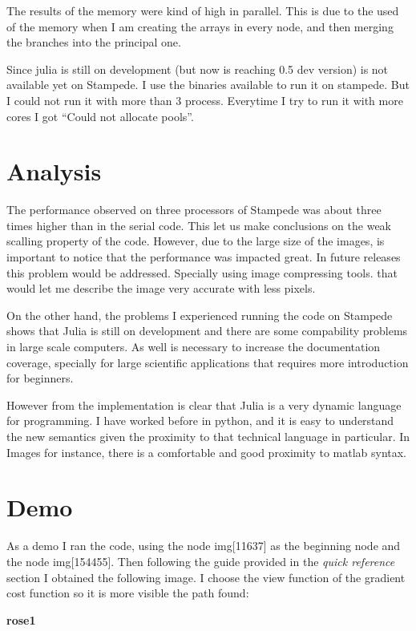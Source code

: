 \documentclass[letterpaper,10pt,english]{sphinxmanual}
\begin{document}
The results of the memory were kind of high in parallel. This is due to the used of the memory when I am creating the arrays in every node, and then merging the branches into the principal one.

Since julia is still on development (but now is reaching 0.5 dev version) is not available yet on Stampede. I use the binaries available to run it on stampede. But I could not run it with more than 3 process. Everytime I try to run it with more cores I got ``Could not allocate pools''.


\chapter{Analysis}
\label{profiling:analysis}
The performance observed on three processors of Stampede was about three times higher than in the serial code. This let us make conclusions on the weak scalling property of the code. However, due to the large size of the images, is important to notice that the performance was impacted great. In future releases this problem would be addressed. Specially using image compressing tools. that would let me describe the image very accurate with less pixels.

On the other hand, the problems I experienced running the code on Stampede shows that Julia is still on development and there are some compability problems in large scale computers. As well is necessary to increase the documentation coverage, specially for large scientific applications that requires more introduction for beginners.

However from the implementation is clear that Julia is a very dynamic language for programming. I have worked before in python, and it is easy to understand the new semantics given the proximity to that technical language in particular. In Images for instance, there is a comfortable and good proximity to matlab syntax.


\chapter{Demo}
\label{profiling:demo}
As a demo I ran the code, using the node img{[}11637{]} as the beginning node and the node img{[}154455{]}. Then following the guide provided in the \emph{quick reference} section I obtained the following image. I choose the view function of the gradient cost function so it is more visible the path found:

{\color{red}\bfseries{}\textbar{}rose1\textbar{}}
\end{document}
